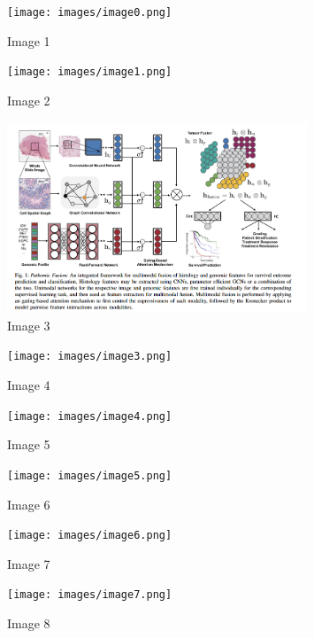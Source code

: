 \documentclass{article}%
\begin{document}
%


\begin{figure}[h!]%
\centering%
\texttt{[image: images/image0.png]}%
\caption{Image 1}%
\end{figure}

%


\begin{figure}[h!]%
\centering%
\texttt{[image: images/image1.png]}%
\caption{Image 2}%
\end{figure}

%


\begin{figure}[h!]%
\centering%
\includegraphics[width=0.8\textwidth]{images/image2.png}%
\caption{Image 3}%
\end{figure}

%


\begin{figure}[h!]%
\centering%
\texttt{[image: images/image3.png]}%
\caption{Image 4}%
\end{figure}

%


\begin{figure}[h!]%
\centering%
\texttt{[image: images/image4.png]}%
\caption{Image 5}%
\end{figure}

%


\begin{figure}[h!]%
\centering%
\texttt{[image: images/image5.png]}%
\caption{Image 6}%
\end{figure}

%


\begin{figure}[h!]%
\centering%
\texttt{[image: images/image6.png]}%
\caption{Image 7}%
\end{figure}

%


\begin{figure}[h!]%
\centering%
\texttt{[image: images/image7.png]}%
\caption{Image 8}%
\end{figure}
\end{document}
